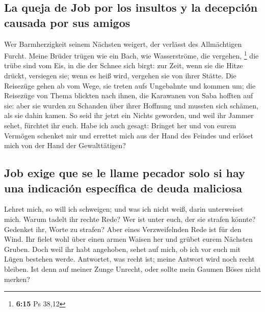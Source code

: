 \hypertarget{la-queja-de-job-por-los-insultos-y-la-decepciuxf3n-causada-por-sus-amigos}{%
\subsection{La queja de Job por los insultos y la decepción causada por
sus
amigos}\label{la-queja-de-job-por-los-insultos-y-la-decepciuxf3n-causada-por-sus-amigos}}

 Wer Barmherzigkeit seinem Nächsten weigert, der verlässt
des Allmächtigen Furcht.  Meine Brüder trügen wie ein
Bach, wie Wasserströme, die vergehen, \footnote{\textbf{6:15} Ps 38,12}
 die trübe sind vom Eis, in die der Schnee sich birgt:
 zur Zeit, wenn sie die Hitze drückt, versiegen sie; wenn
es heiß wird, vergehen sie von ihrer Stätte.  Die
Reisezüge gehen ab vom Wege, sie treten aufs Ungebahnte und kommen um;
 die Reisezüge von Thema blickten nach ihnen, die
Karawanen von Saba hofften auf sie:  aber sie wurden zu
Schanden über ihrer Hoffnung und mussten sich schämen, als sie dahin
kamen.  So seid ihr jetzt ein Nichts geworden, und weil
ihr Jammer sehet, fürchtet ihr euch.  Habe ich auch
gesagt: Bringet her und von eurem Vermögen schenket mir 
und errettet mich aus der Hand des Feindes und erlöset mich von der Hand
der Gewalttätigen?

\hypertarget{job-exige-que-se-le-llame-pecador-solo-si-hay-una-indicaciuxf3n-especuxedfica-de-deuda-maliciosa}{%
\subsection{Job exige que se le llame pecador solo si hay una indicación
específica de deuda
maliciosa}\label{job-exige-que-se-le-llame-pecador-solo-si-hay-una-indicaciuxf3n-especuxedfica-de-deuda-maliciosa}}

 Lehret mich, so will ich schweigen; und was ich nicht
weiß, darin unterweiset mich.  Warum tadelt ihr rechte
Rede? Wer ist unter euch, der sie strafen könnte? 
Gedenket ihr, Worte zu strafen? Aber eines Verzweifelnden Rede ist für
den Wind.  Ihr fielet wohl über einen armen Waisen her
und grübet eurem Nächsten Gruben.  Doch weil ihr habt
angehoben, sehet auf mich, ob ich vor euch mit Lügen bestehen werde.
 Antwortet, was recht ist; meine Antwort wird noch recht
bleiben.  Ist denn auf meiner Zunge Unrecht, oder sollte
mein Gaumen Böses nicht merken?

